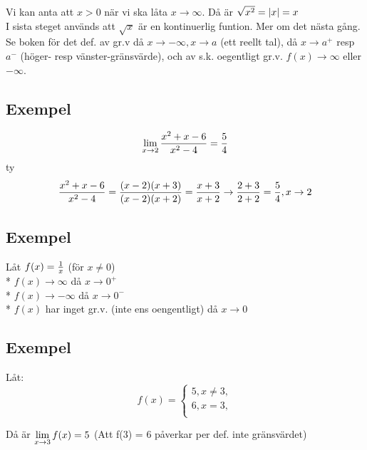 \documentclass{article}
\begin{document}
Vi kan anta att $x>0$ när vi ska låta $x\to\infty$. Då är $\sqrt{x^2} = \lvert x\rvert = x$\\
I sista steget används att $\sqrt x$ är en kontinuerlig funtion. Mer om det nästa gång.\\

Se boken för det def. av gr.v då $x\to -\infty, x\to a$ (ett reellt tal),
då $x\to a^+$ resp $a^-$ (höger- resp vänster-gränsvärde), och av s.k. oegentligt gr.v.
$f(x)\to\infty$ eller $-\infty$.

\subsection{Exempel}
$$ \displaystyle \lim_{x \rightarrow 2} \frac{x^2+x-6}{x^2-4} = \frac{5}{4} $$ty
$$ \frac{x^2+x-6}{x^2-4} = \frac{(x-2)(x+3)}{(x-2)(x+2)} = \frac{x+3}{x+2} \to \frac{2+3}{2+2} = \frac{5}{4}, x\to 2$$

\subsection{Exempel}

Låt $f(x)=\frac{1}{x}$ (för $x\neq 0$)\\
* $f(x)\to \infty$ då $x\to 0^+$\\
* $f(x)\to -\infty$ då $x\to 0^-$\\
* $f(x)$ har inget gr.v. (inte ens oengentligt) då $x\to 0$

\subsection{Exempel}
Låt:
$$
f(x) =
\begin{cases}
  5, x \neq 3,\\
  6, x = 3,\\
\end{cases}
$$

Då är $\displaystyle \lim_{x \rightarrow 3} f(x) =5$ (Att f(3) = 6 påverkar per def. inte gränsvärdet)
\end{document}
